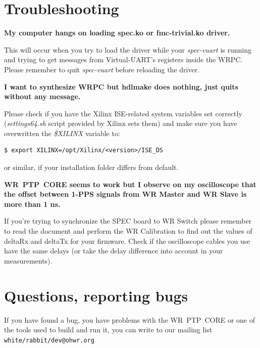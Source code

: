 \documentclass[a4paper, 12pt]{article}
\newcommand{\code}[1]{\texttt{#1}}
\newcommand{\codeHook}[1]{\mbox{\ttfamily\MakeTextUppercase{#1}}}
\begin{document}
\section{Troubleshooting}
\label{Troubleshooting}

\textbf{My computer hangs on loading spec.ko or fmc-trivial.ko driver.}

This will occur when you try to load the driver while your \textit{spec-vuart} is
running and trying to get messages from Virtual-UART's registers inside the
\codeHook{wrpc}. Please remember to quit \textit{spec-vuart} before reloading the driver.

\vspace{1em}
\textbf{I want to synthesize \codeHook{wrpc} but hdlmake does nothing, just quits without any
message.}

Please check if you have the Xilinx ISE-related system variables set correctly
(\textit{settings64.sh} script provided by Xilinx sets them) and make sure you have
overwritten the \textit{\$XILINX} variable to:

\begin{lstlisting}
$ export XILINX=/opt/Xilinx/<version>/ISE_DS
\end{lstlisting}

or similar, if your installation folder differs from default.

\vspace{1em}
\textbf{\codeHook{wr ptp core} seems to work but I observe on my oscilloscope that the offset
between 1-PPS signals from \codeHook{wr} Master and \codeHook{wr} Slave is more than 1 ns.}

If you're trying to synchronize the \codeHook{spec} board to \codeHook{wr} Switch please remember to
read the document and perform the \codeHook{wr} Calibration to find out the values of
deltaRx and deltaTx for your firmware. Check if the oscilloscope cables you use
have the same delays (or take the delay difference into account in your
measurements).


\section{Questions, reporting bugs}
\label{Questions}

If you have found a bug, you have problems with the \codeHook{wr ptp core} or one
of the tools used to build and run it, you can write to our mailing list
\code{white\-/rabbit\-/dev@ohwr.org}
\end{document}
